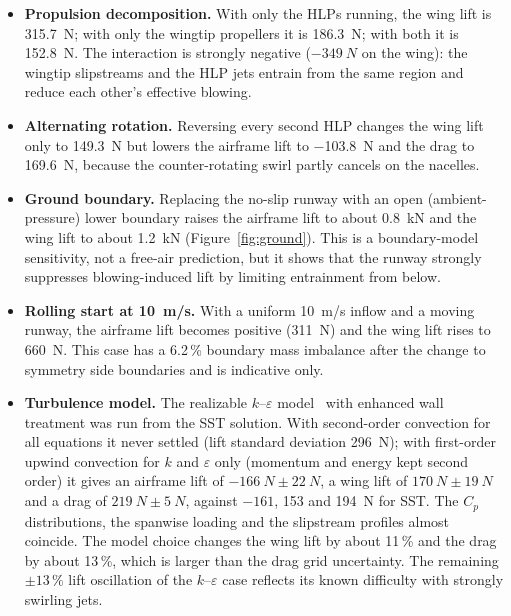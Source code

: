 \documentclass[10pt,a4paper]{article}
\begin{document}
\begin{itemize}[leftmargin=1.3em,itemsep=2pt,topsep=2pt]
  \item \textbf{Propulsion decomposition.} With only the HLPs running, the wing lift is \SI{315.7}{N}; with only the
        wingtip propellers it is \SI{186.3}{N}; with both it is \SI{152.8}{N}. The interaction is strongly
        negative ($-\SI{349}{N}$ on the wing): the wingtip slipstreams and the HLP jets entrain from the same
        region and reduce each other's effective blowing.
  \item \textbf{Alternating rotation.} Reversing every second HLP changes the wing lift only to \SI{149.3}{N} but
        lowers the airframe lift to \SI{-103.8}{N} and the drag to \SI{169.6}{N}, because the counter-rotating swirl
        partly cancels on the nacelles.
  \item \textbf{Ground boundary.} Replacing the no-slip runway with an open (ambient-pressure) lower boundary raises
        the airframe lift to about \SI{+0.8}{kN} and the wing lift to about \SI{1.2}{kN}
        (Figure~\ref{fig:ground}). This is a boundary-model sensitivity, not a free-air prediction, but it shows
        that the runway strongly suppresses blowing-induced lift by limiting entrainment from below.
  \item \textbf{Rolling start at \SI{10}{m/s}.} With a uniform \SI{10}{m/s} inflow and a moving runway, the airframe lift
        becomes positive (\SI{+311}{N}) and the wing lift rises to \SI{660}{N}. This case has a 6.2\,\% boundary mass
        imbalance after the change to symmetry side boundaries and is indicative only.
  \item \textbf{Turbulence model.} The realizable $k$--$\varepsilon$ model~\cite{shih1995rke} with enhanced wall
        treatment was run from the SST solution. With second-order convection for all equations it never settled
        (lift standard deviation \SI{296}{N}); with first-order upwind convection for $k$ and $\varepsilon$ only (momentum
        and energy kept second order) it gives an airframe lift of $\SI{-166}{N}\pm\SI{22}{N}$, a wing lift of
        $\SI{170}{N}\pm\SI{19}{N}$ and a drag of $\SI{219}{N}\pm\SI{5}{N}$, against $-161$, 153 and \SI{194}{N} for SST.
        The $C_p$ distributions, the spanwise loading and the slipstream profiles almost coincide. The model
        choice changes the wing lift by about 11\,\% and the drag by about 13\,\%, which is larger than the drag
        grid uncertainty. The remaining $\pm13\,\%$ lift oscillation of the $k$--$\varepsilon$ case reflects its
        known difficulty with strongly swirling jets.
\end{itemize}
\end{document}
